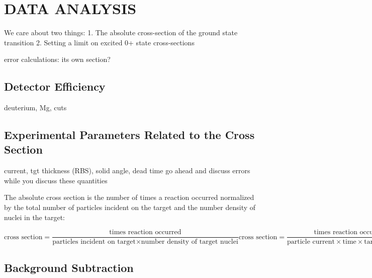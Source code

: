 %
%
%
%
%
%
%
%

%
%

\chapter{DATA ANALYSIS}
\label{chap:dataAnalysis}
We care about two things:
1. The absolute cross-section of the ground state transition
2. Setting a limit on excited 0+ state cross-sections

error calculations: its own section?

\section{Detector Efficiency}

deuterium, Mg, cuts

\section{Experimental Parameters Related to the Cross Section}
current, tgt thickness (RBS), solid angle, dead time
go ahead and discuss errors while you discuss these quantities

The absolute cross section is the number of times a reaction occurred normalized by the total number of particles incident on the target and the number density of nuclei in the target:

\begin{equation}
\text{cross section} = \frac{\text{times reaction occurred}}{\text{particles incident on target} \times \text{number density of target nuclei}}
\text{cross section} = \frac{\text{times reaction occurred}}{\text{particle current} \times \text{time} \times \text{target thickness}}
\label{eq:cross_section}
\end{equation}

\section{Background Subtraction}


